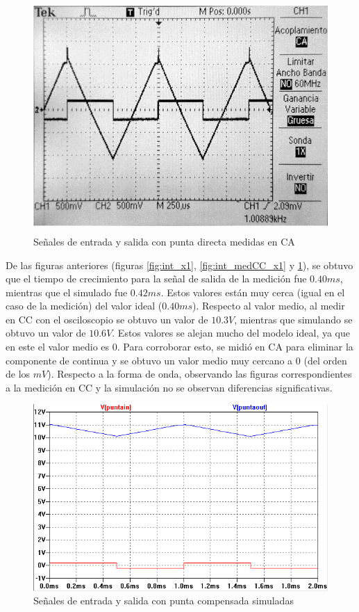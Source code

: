 \documentclass[10pt,spanish,a4paper,openany,notitlepage]{article}
\begin{document}
\begin{figure}[H]
\centering
\includegraphics[width=350pt, height=250pt]{mediciones/B-X1-CA.jpg}
\caption{Señales de entrada y salida con punta directa medidas en CA}
\label{fig:int_medCA_x1}
\end{figure}

De las figuras anteriores (figuras \ref{fig:int_x1}, \ref{fig:int_medCC_x1} y \ref{fig:int_medCA_x1}), se obtuvo que el tiempo de crecimiento para la señal de salida de la medición fue $0.40 \unit{ms}$, mientras que el simulado fue $0.42 \unit{ms}$. Estos valores están muy cerca (igual en el caso de la medición) del valor ideal ($0.40 \unit{ms}$). Respecto al valor medio, al medir en CC con el osciloscopio se obtuvo un valor de $10.3 \unit{V}$, mientras que simulando se obtuvo un valor de $10.6 \unit{V}$. Estos valores se alejan mucho del modelo ideal, ya que en este el valor medio es 0. Para corroborar esto, se midió en CA para eliminar la componente de continua y se obtuvo un valor medio muy cercano a 0 (del orden de los $\unit{mV}$). Respecto a la forma de onda, observando las figuras correspondientes a la medición en CC y la simulación no se observan diferencias significativas.

\begin{figure}[H]
\centering
\includegraphics[scale=0.8]{simulaciones/BsinR2puntax10.png}
\caption{Señales de entrada y salida con punta compensada simuladas}
\label{fig:int_x10}
\end{figure}
\end{document}
